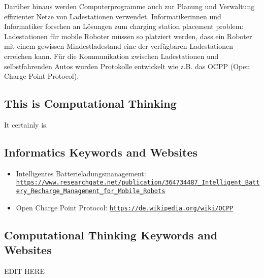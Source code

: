 \documentclass[a4paper,11pt]{report}
\newcommand{\BrochureUrlText}[1]{\texttt{#1}}
\begin{document}
Darüber hinaus werden Computerprogramme auch zur Planung und Verwaltung effizienter Netze von Ladestationen verwendet. Informatikerinnen und Informatiker forschen an Lösungen zum charging station placement problem: Ladestationen für mobile Roboter müssen so platziert werden, dass ein Roboter mit einem gewissen Mindestladestand eine der verfügbaren Ladestationen erreichen kann. Für die Kommunikation zwischen Ladestationen und selbstfahrenden Autos wurden Protokolle entwickelt wie z.B. das OCPP (Open Charge Point Protocol).


\subsection*{This is Computational Thinking}

It certainly is.


\subsection*{Informatics Keywords and Websites}

\begin{itemize}
  \item Intelligentes Batterieladungsmanagement: \href{https://www.researchgate.net/publication/364734487_Intelligent_Battery_Recharge_Management_for_Mobile_Robots}{\BrochureUrlText{https://www.researchgate.net/publication/364734487\_Intelligent\_Battery\_Recharge\_Management\_for\_Mobile\_Robots}}
  \item Open Charge Point Protocol: \href{https://de.wikipedia.org/wiki/OCPP}{\BrochureUrlText{https://de.wikipedia.org/wiki/OCPP}}
\end{itemize}


\subsection*{Computational Thinking Keywords and Websites}

EDIT HERE
\end{document}
